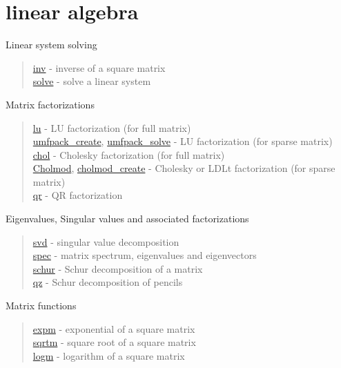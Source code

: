 \chapter*{linear algebra}

Linear system solving
\begin{quote}
\noindent
\hyperlink{inv}{inv} -  inverse of a square matrix  \\
\hyperlink{solve}{solve} - solve a linear system \\
\end{quote}

Matrix factorizations

\begin{quote}
\noindent
\hyperlink{lu}{lu} - LU factorization (for full matrix) \\
\hyperlink{umfpack_create}{umfpack\_create},\;
\hyperlink{umfpack_solve}{umfpack\_solve} - LU factorization (for sparse matrix) \\
\hyperlink{chol}{chol} - Cholesky factorization (for full matrix) \\
\hyperlink{Cholmod}{Cholmod},\;
\hyperlink{cholmod_create}{cholmod\_create} - Cholesky or LDLt factorization (for sparse matrix) \\
\hyperlink{qr}{qr} - QR factorization
\end{quote}


Eigenvalues, Singular values and associated factorizations

\begin{quote}
\noindent
\hyperlink{svd}{svd} - singular value decomposition \\
\hyperlink{spec}{spec} - matrix spectrum, eigenvalues and eigenvectors\\
\hyperlink{schur}{schur} - Schur decomposition of a matrix \\
\hyperlink{qz}{qz} - Schur decomposition of pencils \\
\end{quote}


Matrix functions

\begin{quote}
\noindent
\hyperlink{expm}{expm} - exponential of a square matrix \\ %
\hyperlink{sqrtm}{sqrtm} - square root of a square matrix \\ %
\hyperlink{logm}{logm} - logarithm of a square matrix \\ %
\end{quote}


